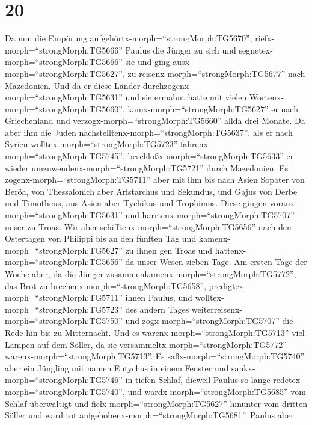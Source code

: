 \hypertarget{section-19}{%
\section{20}\label{section-19}}

 Da nun die Empörung
aufgehörtx-morph=``strongMorph:TG5670'',
riefx-morph=``strongMorph:TG5666'' Paulus die Jünger zu sich und
segnetex-morph=``strongMorph:TG5666'' sie und ging
ausx-morph=``strongMorph:TG5627'', zu
reisenx-morph=``strongMorph:TG5677'' nach Mazedonien.  Und
da er diese Länder durchzogenx-morph=``strongMorph:TG5631'' und sie
ermahnt hatte mit vielen Wortenx-morph=``strongMorph:TG5660'',
kamx-morph=``strongMorph:TG5627'' er nach Griechenland und
verzogx-morph=``strongMorph:TG5660'' allda drei Monate.  Da
aber ihm die Juden nachstelltenx-morph=``strongMorph:TG5637'', als er
nach Syrien wolltex-morph=``strongMorph:TG5723''
fahrenx-morph=``strongMorph:TG5745'',
beschloßx-morph=``strongMorph:TG5633'' er wieder
umzuwendenx-morph=``strongMorph:TG5721'' durch Mazedonien. 
Es zogenx-morph=``strongMorph:TG5711'' aber mit ihm bis nach Asien
Sopater von Beröa, von Thessalonich aber Aristarchus und Sekundus, und
Gajus von Derbe und Timotheus, aus Asien aber Tychikus und Trophimus.
 Diese gingen voranx-morph=``strongMorph:TG5631'' und
harrtenx-morph=``strongMorph:TG5707'' unser zu Troas.  Wir
aber schifftenx-morph=``strongMorph:TG5656'' nach den Ostertagen von
Philippi bis an den fünften Tag und kamenx-morph=``strongMorph:TG5627''
zu ihnen gen Troas und hattenx-morph=``strongMorph:TG5656'' da unser
Wesen sieben Tage.  Am ersten Tage der Woche aber, da die
Jünger zusammenkamenx-morph=``strongMorph:TG5772'', das Brot zu
brechenx-morph=``strongMorph:TG5658'',
predigtex-morph=``strongMorph:TG5711'' ihnen Paulus, und
wolltex-morph=``strongMorph:TG5723'' des andern Tages
weiterreisenx-morph=``strongMorph:TG5750'' und
zogx-morph=``strongMorph:TG5707'' die Rede hin bis zu Mitternacht.
 Und es warenx-morph=``strongMorph:TG5713'' viel Lampen auf
dem Söller, da sie versammeltx-morph=``strongMorph:TG5772''
warenx-morph=``strongMorph:TG5713''.  Es
saßx-morph=``strongMorph:TG5740'' aber ein Jüngling mit namen Eutychus
in einem Fenster und sankx-morph=``strongMorph:TG5746'' in tiefen
Schlaf, dieweil Paulus so lange redetex-morph=``strongMorph:TG5740'',
und wardx-morph=``strongMorph:TG5685'' vom Schlaf überwältigt und
fielx-morph=``strongMorph:TG5627'' hinunter vom dritten Söller und ward
tot aufgehobenx-morph=``strongMorph:TG5681''.  Paulus aber
